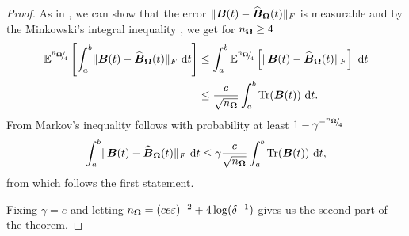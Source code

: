 \documentclass[12pt]{article}
\begin{document}
\begin{proof}
    As in \cite{kressner-2023-randomized-lowrank}, we can show that the error $\lVert \boldsymbol{B}(t) - \widehat{\boldsymbol{B}}_{\boldsymbol{\Omega}}(t) \rVert _F$ is measurable and by the Minkowski's integral inequality \cite[theorem 202]{hardy-1952-inequalities}, we get for $n_{\boldsymbol{\Omega}} \geq 4$
    \begin{align}
        \mathbb{E}^{{}^{n_{\boldsymbol{\Omega}}}{\mskip -5mu/\mskip -3mu}_{4}}\left[ \int_{a}^{b} \lVert \boldsymbol{B}(t) - \widehat{\boldsymbol{B}}_{\boldsymbol{\Omega}}(t) \rVert _F~\mathrm{d}t \right] 
        &\leq \int_{a}^{b} \mathbb{E}^{{}^{n_{\boldsymbol{\Omega}}}{\mskip -5mu/\mskip -3mu}_{4}} \left[\lVert \boldsymbol{B}(t) - \widehat{\boldsymbol{B}}_{\boldsymbol{\Omega}}(t) \rVert _F \right] ~\mathrm{d}t \notag \\
        &\leq \frac{c}{\sqrt{n_{\boldsymbol{\Omega}}}} \int_{a}^{b} \operatorname{Tr}(\boldsymbol{B}(t))~\mathrm{d}t.
    \end{align}
    From Markov's inequality follows with probability at least $1 - \gamma^{-{}^{n_{\boldsymbol{\Omega}}}{\mskip -5mu/\mskip -3mu}_{4}}$
    \begin{equation}
        \int_{a}^{b} \lVert \boldsymbol{B}(t) - \widehat{\boldsymbol{B}}_{\boldsymbol{\Omega}}(t) \rVert _F~\mathrm{d}t \leq \gamma \frac{c}{\sqrt{n_{\boldsymbol{\Omega}}}} \int_{a}^{b} \operatorname{Tr}(\boldsymbol{B}(t))~\mathrm{d}t,
    \end{equation}
    from which follows the first statement.

    Fixing $\gamma = e$ and letting $n_{\boldsymbol{\Omega}} = (c e \varepsilon)^{-2}  + 4 \log(\delta^{-1})$ gives us the second part of the theorem.


\end{proof}
\end{document}
